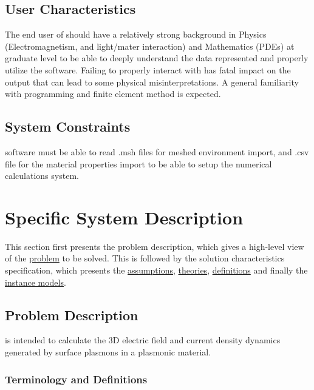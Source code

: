\documentclass[12pt]{article}
\begin{document}
	\subsection{User Characteristics} \label{SecUserCharacteristics} The end user of
	\progname{} should have a relatively strong background in  Physics
	(Electromagnetism, and light/mater interaction) and Mathematics (PDEs) at
	graduate level to be able to deeply understand the data represented and properly
	utilize the software. Failing to properly interact with \progname{} has fatal
	impact on the output that can lead to some physical misinterpretations. A
	general familiarity with programming and finite element method is expected.
	
	
	
	
	\subsection{System Constraints} \progname software must be able to read .msh
	files for meshed environment import, and .csv file for the material properties
	import to be able to setup the numerical calculations system.
	
	\section{Specific System Description}
	
	This section first presents the problem description, which gives a high-level
	view of the \hyperref[Sec_pd]{problem} to be solved. This is followed by the
	solution characteristics specification, which presents the
	\hyperref[sec_assumpt]{assumptions}, \hyperref[sec_theoretical]{theories},
	\hyperref[sec_datadef]{definitions} and finally the
	\hyperref[sec_instance]{instance models}.
	
	\subsection{Problem Description} \label{Sec_pd}
	
	\progname{} is intended to calculate the 3D electric field and current density
	dynamics generated by surface plasmons in a plasmonic material.
	
	\subsubsection{Terminology and  Definitions}
	
\end{document}
